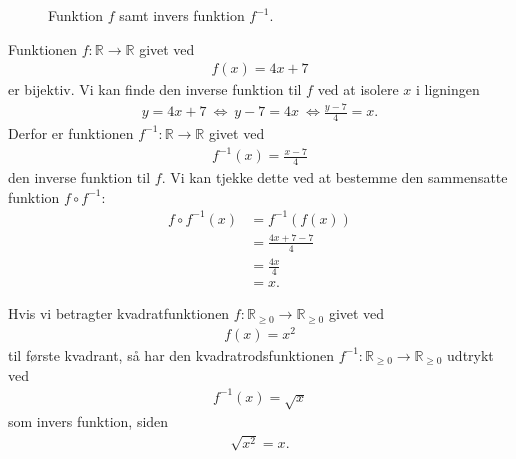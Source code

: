 \begin{figure}[H]
	\centering
	\caption{Funktion $f$ samt invers funktion $f^{-1}$.}
	\label{fig:inv}
\end{figure}
\begin{exa}
Funktionen $f: \mathbb{R} \to \mathbb{R}$ givet ved
\begin{align*}
	f(x) = 4x+7
\end{align*}
er bijektiv. Vi kan finde den inverse funktion til $f$ ved at isolere $x$ i ligningen
\begin{align*}
	y = 4x+7 \ \Leftrightarrow \ y-7 = 4x \ \Leftrightarrow \frac{y-7}{4} = x.
\end{align*}
Derfor er funktionen $f^{-1}:\mathbb{R} \to \mathbb{R}$ givet ved
\begin{align*}
	f^{-1}(x) = \frac{x-7}{4}
\end{align*}
den inverse funktion til $f$. Vi kan tjekke dette ved at bestemme den sammensatte funktion $f\circ f^{-1}$:
\begin{align*}
f\circ f^{-1}(x) &= f^{-1}(f(x))\\
&= \frac{4x+7-7}{4}\\
&= \frac{4x}{4}\\
&= x.
\end{align*}
\end{exa}

\begin{exa}
Hvis vi betragter kvadratfunktionen $f: \mathbb{R}_{\geq 0} \to \mathbb{R}_{\geq 0}$ givet ved
\begin{align*}
	f(x) = x^2
\end{align*}
til første kvadrant, så har den kvadratrodsfunktionen $f^{-1}: \mathbb{R}_{\geq 0} \to \mathbb{R}_{\geq 0}$ udtrykt ved
\begin{align*}
	f^{-1}(x) = \sqrt{x}
\end{align*}
som invers funktion, siden
\begin{align*}
	\sqrt{x^2} = x.
\end{align*}
\end{exa}


